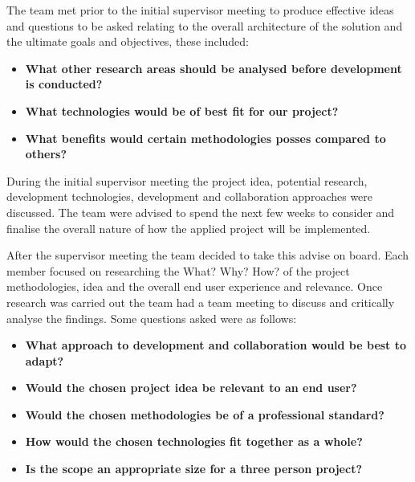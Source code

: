 \vspace{5mm} %

The team met prior to the initial supervisor meeting to produce effective ideas and questions to be asked relating to the overall architecture of the solution and the ultimate goals and objectives, these included:

\begin{itemize}

    \item \textbf{What other research areas should be analysed before development is conducted?}

    \item \textbf{What technologies would be of best fit for our project?}
    
    \item \textbf{What benefits would certain methodologies posses compared to others?}
    
\end{itemize}

During the initial supervisor meeting the project idea, potential research, development technologies, development and collaboration approaches were discussed. The team were advised to spend the next few weeks to consider and finalise the overall nature of how the applied project will be implemented.

\vspace{5mm} %

After the supervisor meeting the team decided to take this advise on board. Each member focused on researching the What? Why? How? of the project methodologies, idea and the overall end user experience and relevance. Once research was carried out the team had a team meeting to discuss and critically analyse the findings. Some questions asked were as follows:

\begin{itemize}

    \item \textbf{What approach to development and collaboration would be best to adapt?}
    
    \item \textbf{Would the chosen project idea be relevant to an end user?}
    
     \item \textbf{Would the chosen methodologies be of a professional standard?}
    
    \item \textbf{How would the chosen technologies fit together as a whole?}
    
    \item \textbf{Is the scope an appropriate size for a three person project?}
    
\end{itemize}

